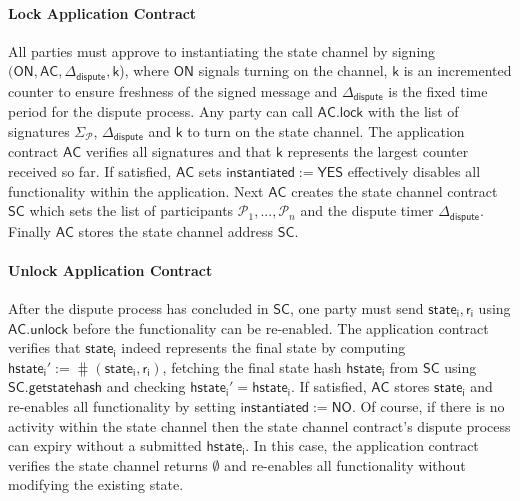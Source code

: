 \documentclass{llncs}
\newcommand{\instantiated}{\mathsf{instantiated}}
\newcommand{\instantiatedno}{\mathsf{NO}}
\newcommand{\instantiatedyes}{\mathsf{YES}}
\newcommand{\chanon}{\mathsf{ON}}
\newcommand{\hstatei}{\mathsf{hstate}_{\monotoniccounter}}
\newcommand{\monotoniccounter}{\mathsf{i}}
\newcommand{\stateinfoi}{\mathsf{state}_{\mathsf{i}}}
\newcommand{\participant}{\mathcal{P}}
\newcommand{\rani}{\mathsf{r}_{\mathsf{i}}}
\newcommand{\statechannel}{\mathsf{SC}}
\newcommand{\statechannelgetcommitment}{\mathsf{SC}.\mathsf{getstatehash}}
\newcommand{\appcontract}{\mathsf{AC}}
\newcommand{\applock}{\mathsf{AC.lock}}
\newcommand{\appunlock}{\mathsf{AC.unlock}}
\newcommand{\timerdispute}{\mathsf{\Delta}_{\mathsf{dispute}}}
\begin{document}


 
\paragraph{Lock Application Contract} All parties must approve to instantiating the state channel by signing $(\chanon, \appcontract, \timerdispute, \mathsf{k}$), where $\chanon$ signals turning on the channel, $\mathsf{k}$ is an incremented counter to ensure freshness of the signed message and $\timerdispute$ is the fixed time period for the dispute process. 
Any party can call $\applock$ with the list of signatures $\Sigma_{\participant}$, $\timerdispute$ and $\mathsf{k}$ to turn on the state channel. 
The application contract $\appcontract$ verifies all signatures and that $\mathsf{k}$ represents the largest counter received so far.
If satisfied, $\appcontract$ sets  $\instantiated := \instantiatedyes$ effectively disables all functionality within the application.
Next $\appcontract$ creates the state channel contract $\statechannel$ which sets the list of participants $\participant_{1},...,\participant_{n}$ and the dispute timer $\timerdispute$. 
Finally $\appcontract$ stores the state channel address $\statechannel$. 
 

\paragraph{Unlock Application Contract}

After the dispute process has concluded in $\statechannel$, one party must send  $\stateinfoi,\rani$ using $\appunlock$ before the functionality can be re-enabled.
The application contract verifies that $\stateinfoi$  indeed represents the final state by computing $\hstatei' := \hash(\stateinfoi, \rani)$, fetching the final state hash $\hstatei$ from $\statechannel$ using $\statechannelgetcommitment$ and checking  $\hstatei' = \hstatei$. 
If satisfied, $\appcontract$ stores $\stateinfoi$ and re-enables all functionality by setting $\instantiated :=  \instantiatedno$. 
Of course, if there is no activity within the state channel then the state channel contract's dispute process can expiry  without a submitted $\hstatei$.
In this case, the application contract verifies the state channel returns $\emptyset$ and re-enables all functionality without modifying the existing state. 
\end{document}
